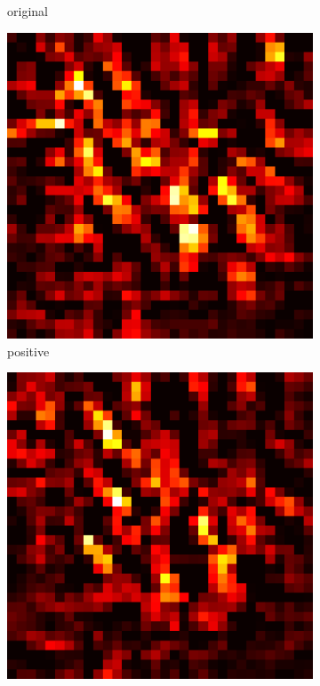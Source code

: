 \documentclass[preprint,12pt]{elsarticle}
\begin{document}
\begin{figure}
\begin{subfigure}{0.14\linewidth}
        \caption{original}
    \end{subfigure}
    \hfill
    \begin{subfigure}{0.14\textwidth}
        \centering
        \includegraphics[width=\linewidth]{../visualizations/examples/cifar10/cnn/positive_saliency_map/4.png}
        \caption{positive}
    \end{subfigure}
    \hfill
    \begin{subfigure}{0.14\textwidth}
        \centering
        \includegraphics[width=\linewidth]{../visualizations/examples/cifar10/cnn/negative_saliency_map/4.png}

\end{subfigure}
\end{figure}
\end{document}
